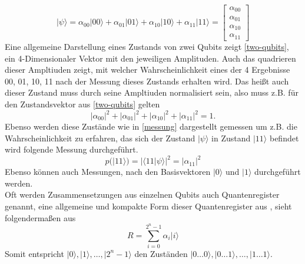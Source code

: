 \begin{equation}\label{two-qubits}
|\psi \rangle = \alpha_{00} |00\rangle + \alpha_{01} |01\rangle + \alpha_{10} |10\rangle + \alpha_{11} |11\rangle = \begin{bmatrix} \alpha_{00} \\ \alpha_{01} \\ \alpha_{10} \\ \alpha_{11} \end{bmatrix}
\end{equation}
Eine allgemeine Darstellung eines Zustands von zwei Qubits zeigt \ref{two-qubits}, ein 4-Dimensionaler Vektor mit den jeweiligen Amplituden. Auch das quadrieren dieser Ampltiuden zeigt, mit welcher Wahrscheinlichkeit eines der 4 Ergebnisse 00, 01, 10, 11 nach der Messung dieses Zustands erhalten wird.
Das hei\ss t auch dieser Zustand muss durch seine Ampltiuden normalisiert sein, also muss z.B. f\"ur den Zustandsvektor aus \ref{two-qubits} gelten
\begin{equation}
|\alpha_{00}|^2+|\alpha_{01}|^2+|\alpha_{10}|^2+|\alpha_{11}|^2 = 1 .
\end{equation}
Ebenso werden diese Zust\"ande wie in \ref{messung} dargestellt gemessen um z.B. die Wahrscheinlichkeit zu erfahren, das sich der Zustand $|\psi \rangle$ in Zustand $|11\rangle$ befindet wird folgende Messung durchgef\"uhrt.
\begin{equation}
p(|11\rangle) = |\langle 11| \psi  \rangle|^2 = |\alpha_{11}|^2
\end{equation}
Ebenso k\"onnen auch Messungen, nach den Basisvektoren $|0 \rangle$ und $| 1\rangle$ durchgef\"uhrt werden.
\\
Oft werden Zusammensetzungen aus einzelnen Qubits auch Quantenregister genannt, eine allgemeine und kompakte Form dieser Quantenregister aus \cite{Homeister-2022}, sieht folgenderma\ss en aus
\begin{equation}
R = \sum\limits_{i=0}^{2^{n}-1} \alpha_i |i\rangle
\end{equation}
Somit entspricht $|0\rangle, |1\rangle, \dots, |2^{n}-1\rangle$ den Zust\"anden $|0\dots 0\rangle, |0\dots 1\rangle, \dots, |1\dots 1\rangle$.
